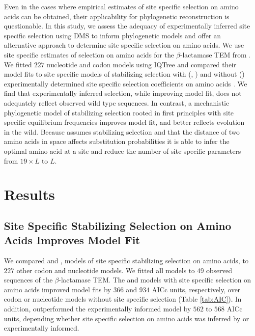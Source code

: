 Even in the cases where empirical estimates of site specific selection on amino acids can be obtained, their applicability for phylogenetic reconstruction is questionable.
In this study, we assess the adequacy of experimentally inferred site specific selection using DMS to inform phylogenetic models and offer an alternative approach to determine site specific selection on amino acids.
We use site specific estimates of selection on amino acids for the $\beta$-lactamase TEM from \citet{stiffler2016}.
We fitted $227$ nucleotide and codon models using IQTree and compared their model fits to site specific models of stabilizing selection with (\phydms, \selacDMS) and without (\selac) experimentally determined site specific selection coefficients on amino acids \citep{nguyen2015,hilton2017,beaulieu2018}.
We find that experimentally inferred selection, while improving model fit, does not adequately reflect observed wild type sequences.
In contrast, \selac \citep{beaulieu2018} a mechanistic phylogenetic model of stabilizing selection rooted in first principles with site specific equilibrium frequencies improves model fit, and better reflects evolution in the wild.
Because \selac assumes stabilizing selection and that the distance of two amino acids in \PC space affects substitution probabilities it is able to infer the optimal amino acid at a site and reduce the number of site specific parameters from $19\times L$ to $L$.

\section{Results}

\subsection{Site Specific Stabilizing Selection on Amino Acids Improves Model Fit}
We compared \phydms \citep{hilton2017} and \selac \citep{beaulieu2018}, models of site specific stabilizing selection on amino acids, to $227$ other codon and nucleotide models.
We fitted all models to 49 observed sequences of the $\beta$-lactamase TEM.
The \phydms and \selac models with site specific selection on amino acids improved model fits by $366$ and $934$ AICc units, respectively, over codon or nucleotide models without site specific selection (Table \ref{tab:AIC}).
In addition, \selac outperformed the experimentally informed model \phydms by $562$ to $568$ AICc units, depending whether site specific selection on amino acids was inferred by \selac or experimentally informed.

